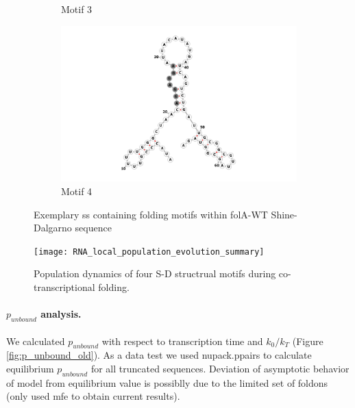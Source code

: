 \documentclass[11pt, a4paper]{article}
\begin{document}
\begin{figure}
\begin{subfigure}[b]{0.475\textwidth}
   		\caption[]%
   		{{\small Motif 3}}
    	\label{fig:mean and std of net34}
    \end{subfigure}
   	\quad
   	\begin{subfigure}[b]{0.475\textwidth}
   		\centering
    	\includegraphics[width=\textwidth]{folding_example_grey}
    	\caption[]%
   		{{\small Motif 4}}
   		\label{fig:mean and std of net44}
   	\end{subfigure}
    \caption[ Exemplary ss containing folding motifs within folA-WT Shine-Dalgarno sequence ]
   	{\small Exemplary ss containing folding motifs within folA-WT Shine-Dalgarno sequence}
   	\label{fig:local_foldings}
\end{figure}

\begin{figure}[tph]
\centering
\texttt{[image: RNA\_local\_population\_evolution\_summary]}
\caption[Population dynamics]{\small Population dynamics of four S-D structrual motifs during co-transcriptional folding.}
\label{fig:populations}
\end{figure}

\paragraph{$p_{unbound}$ analysis.} We calculated $p_{unbound}$ with respect to transcription time and $k_0/k_T$ (Figure \ref{fig:p_unbound_old}). As a data test we used nupack.ppairs to calculate equilibrium $p_{unbound }$ for all truncated sequences. Deviation of asymptotic behavior of model from equilibrium value is possiblly due to the limited set of foldons (only used mfe to obtain current results).
\end{document}
